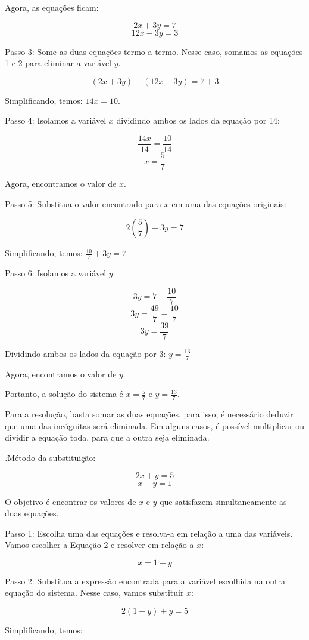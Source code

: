 {Agora, as equações ficam: 

 $$2x + 3y = 7 $$
 $$12x - 3y = 3$$

Passo 3: Some as duas equações termo a termo. Nesse caso, somamos as
equações 1 e 2 para eliminar a variável $y$.

$$(2x + 3y) + (12x - 3y) = 7 + 3$$

Simplificando, temos: $14x = 10$.

Passo 4: Isolamos a variável $x$ dividindo ambos os lados da equação por
14:

$$\frac {14x}{14} = \frac {10}{14}$$
$$x = \frac {5}{7}$$

Agora, encontramos o valor de $x$.

Passo 5: Substitua o valor encontrado para $x$ em uma das equações
originais:

$$2\left(\frac {5}{7}\right) + 3y = 7$$

Simplificando, temos: $\frac {10}{7} + 3y = 7$

Passo 6: Isolamos a variável $y$:

$$3y = 7 - \frac {10}{7}$$
$$3y = \frac {49}{7} - \frac {10}{7}$$
$$3y = \frac {39}{7}$$

Dividindo ambos os lados da equação por 3: $y = \frac {13}{7}$

Agora, encontramos o valor de $y$.

Portanto, a solução do sistema é $x = \frac {5}{7}$ e $y = \frac {13}{7}$.

Para a resolução, basta somar as duas equações, para isso, é necessário
deduzir que uma das incógnitas será eliminada. Em alguns casos, é
possível multiplicar ou dividir a equação toda, para que a outra seja
eliminada.

\textit:{Método da substituição:}

$$2x + y = 5 $$
$$x - y = 1$$

O objetivo é encontrar os valores de $x$ e $y$ que satisfazem
simultaneamente as duas equações.

Passo 1: Escolha uma das equações e resolva-a em relação a uma das
variáveis. Vamos escolher a Equação 2 e resolver em relação a $x$:

$$x = 1 + y$$

Passo 2: Substitua a expressão encontrada para a variável escolhida na
outra equação do sistema. Nesse caso, vamos substituir $x$:

$$2(1 + y) + y = 5$$

Simplificando, temos: 

}
